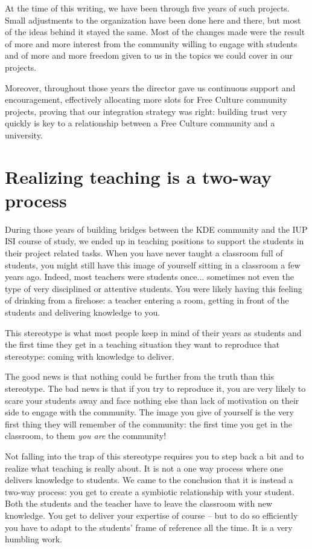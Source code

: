 At the time of this writing, we have been through five years of such projects.
Small adjustments to the organization have been done here and there, but most of
the ideas behind it stayed the same. Most of the changes made were the result of
more and more interest from the community willing to engage with students and
of more and more freedom given to us in the topics we could cover in our
projects.

Moreover, throughout those years the director gave us continuous support and
encouragement, effectively allocating more slots for Free Culture community
projects, proving that our integration strategy was right: building trust very
quickly is key to a relationship between a Free Culture community and a
university.

\section*{Realizing teaching is a two-way process}
During those years of building bridges between the KDE community and the IUP ISI
course of study, we ended up in teaching positions to support the students in
their project related tasks. When you have never taught a classroom
full of students, you might still have this image of yourself sitting in a
classroom a few years ago. Indeed, most teachers were students once... sometimes
not even the type of very disciplined or attentive students. You were likely
having this feeling of drinking from a firehose: a teacher entering a room,
getting in front of the students and delivering knowledge to you.

This stereotype is what most people keep in mind of their years as students and
the first time they get in a teaching situation they want to reproduce that
stereotype: coming with knowledge to deliver.

The good news is that nothing could be further from the truth than this
stereotype. The bad news is that if you try to reproduce it, you are very likely
to scare your students away and face nothing else than lack of motivation on
their side to engage with the community. The image you give of yourself is the
very first thing they will remember of the community: the first time you get in
the classroom, to them \emph{you are} the community!

Not falling into the trap of this stereotype requires you to step back a bit and to realize what teaching is really about. It is not a one way process where one
delivers knowledge to students. We came to the conclusion that it is instead a
two-way process: you get to create a symbiotic relationship with your student.
Both the students and the teacher have to leave the classroom with new
knowledge. You get to deliver your expertise of course -- but to do so efficiently
you have to adapt to the students' frame of reference all the time. It is a very
humbling work.


